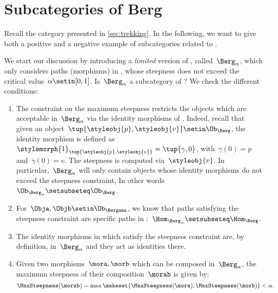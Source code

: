 
\section{Subcategories of Berg}
\label{sec:subcat_berg}

Recall the category \Berg presented in \cref{sec:trekking}.
In the following, we want to give both a positive and a negative example of subcategories related to \Berg.

We start our discussion by introducing a \emph{limited} version of \Berg, called~$\Berg_\alpha$, which only considers paths (morphisms) in \Berg, whose steepness does not exceed the critical value~$\alpha\setin [0,1]$.
Is~$\Berg_\alpha$ a subcategory of \Berg?
We check the different conditions:
\begin{enumerate}
    \item The constraint on the maximum steepness restricts the objects which are acceptable in~$\Berg_\alpha$ via the identity morphisms of \Berg.
          Indeed, recall that given an object~$\tup{\styleobj{p},\styleobj{v}}\setin \Ob_{\Berg}$, the identity morphism is defined as~$\stylemorph{1}_{\tup{\styleobj{p},\styleobj{v}}}=\tup{\gamma,0}$, with~$\gamma(0)=p$ and~$\dot{\gamma}(0)=v$.
          The steepness is computed via~$\styleobj{v}$.
          In particular,~$\Berg_\alpha$ will only contain objects whose identity morphisms do not exceed the steepness constraint, In other words~$\Ob_{\Berg_\alpha} \setsubseteq \Ob_\Berg$.
    \item For~$\Obja,\Objb\setin \Ob_{\Bergama}$, we know that paths satisfying the steepness constraint are specific paths in \Berg:~$\Hom_{\Berg_\alpha}\setsubseteq \Hom_{\Berg}$.
    \item The identity morphisms in \Berg which satisfy the steepness constraint are, by definition, in~$\Berg_\alpha$ and they act as identities there.
    \item Given two morphisms~$\mora,\morb$ which can be composed in~$\Berg_\alpha$, the maximum steepness of their composition~$\morab$ is given by:
          \begin{equation}
              \MaxSteepness(\morab)
              =
              \max \makeset{
                  \MaxSteepness(\mora),
                  \MaxSteepness(\morb)
              }
              <
              \alpha.
          \end{equation}
\end{enumerate}

